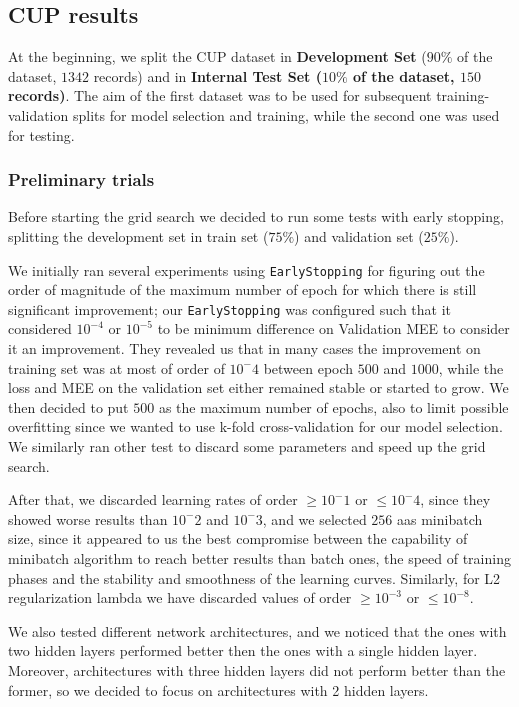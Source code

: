 \subsection{CUP results}

At the beginning, we split the CUP dataset in \textbf{Development Set} ($90\%$ of the dataset, $1342$ records) and in  \textbf{Internal Test Set ($10\%$ of the dataset, $150$ records)}. The aim of the first dataset was to be used for subsequent training-validation splits for model selection and training, while the second one was used for testing.

\subsubsection{Preliminary trials}

Before starting the grid search we decided to run some tests with early stopping, splitting the development set in train set ($75\%$) and validation set ($25\%$).

We initially ran several experiments using \texttt{EarlyStopping} for figuring out the order of magnitude of the maximum number of epoch for which there is still significant improvement; our \texttt{EarlyStopping} was configured such that it considered $10^{-4}$ or $10^{-5}$ to be minimum difference on Validation MEE to consider it an improvement. They revealed us that in many cases the improvement on training set was at most of order of $10^-4$ between epoch $500$ and $1000$, while the loss and MEE on the validation set either remained stable or started to grow. We then decided to put $500$ as the maximum number of epochs, also to limit possible overfitting since we wanted to use k-fold cross-validation for our model selection. We similarly ran other test to discard some parameters and speed up the grid search. 

After that, we discarded learning rates of order $ \geq 10^-1$ or $\leq 10^-4$, since they showed worse results than $10^-2$ and $10^-3$, and we selected $256$ aas minibatch size, since it appeared to us the best compromise between the capability of minibatch algorithm to reach better results than batch ones, the speed of training phases and the stability and smoothness of the learning curves. Similarly, for L2 regularization lambda we have discarded values of order $\ge 10^{-3}$ or $\le 10^{-8}$.

We also tested different network architectures, and we noticed that the ones with two hidden layers performed better then the ones with a single hidden layer. Moreover, architectures with three hidden layers did not perform better than the former, so we decided to focus on architectures with 2 hidden layers.

